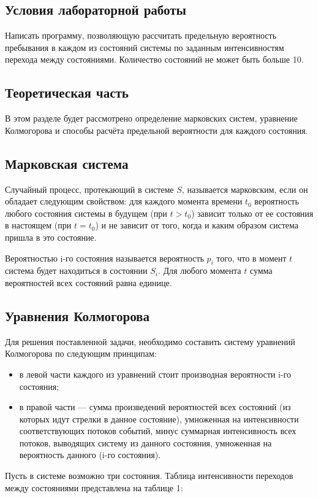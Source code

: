\subsection*{Условия лабораторной работы}
Написать программу, позволяющую рассчитать предельную вероятность пребывания в каждом из состояний системы по заданным интенсивностям перехода между состояниями. Количество состояний не может быть больше 10. 

\subsection*{Теоретическая часть}
В этом разделе будет рассмотрено определение марковских систем, уравнение Колмогорова и способы расчёта предельной вероятности для каждого состояния.

\subsection*{Марковская система}
Случайный процесс, протекающий в системе $S$, называется марковским, если он обладает следующим свойством: для каждого момента времени $t_0$ вероятность любого состояния системы в будущем (при $t > t_0$) зависит только от ее состояния в настоящем (при $t = t_0$) и не зависит от того, когда и каким образом система пришла в это состояние. 

Вероятностью i-го состояния называется вероятность $p_i$ того, что в момент $t$ система будет находиться в состоянии $S_i$.
Для любого момента $t$ сумма вероятностей всех состояний равна единице.

\subsection*{Уравнения Колмогорова}
Для решения поставленной задачи, необходимо составить систему уравнений Колмогорова по следующим принципам: 
\begin{itemize}
	\item в левой части каждого из уравнений стоит производная вероятности i-го состояния; 
	\item в правой части — сумма произведений вероятностей всех состояний (из которых идут стрелки в данное состояние), умноженная на интенсивности соответствующих потоков событий, минус суммарная интенсивность всех потоков, выводящих систему из данного состояния, умноженная на вероятность данного (i-го состояния).
\end{itemize}

Пусть в системе возможно три состояния.
Таблица интенсивности переходов между состояниями представлена на таблице 1:

